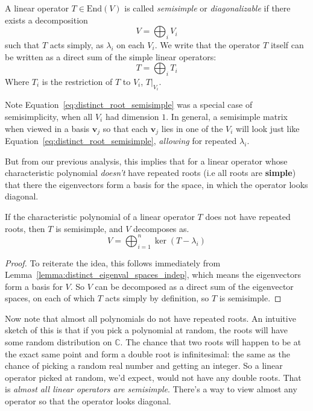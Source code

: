 \begin{appendices}
	\begin{defn}[Semisimplicity]
		A linear operator $T \in \mathrm{End}(V)$ is called \emph{semisimple} or \emph{diagonalizable} if there exists a decomposition 
		\begin{equation}
			V = \bigoplus_i V_i
		\end{equation}
		such that $T$ acts simply, as $\lambda_i$ on each $V_i$. We write that the operator $T$ itself can be written as a direct sum of the simple linear operators:
		\begin{equation}
			T = \bigoplus_i T_i
		\end{equation}
		Where $T_i$ is the restriction of $T$ to $V_i$, $T|_{V_i}$.
	\end{defn}
	
	
	Note Equation~\eqref{eq:distinct_root_semisimple} was a special case of semisimplicity, when all $V_i$ had dimension $1$. In general, a semisimple matrix when viewed in a basis $\mathbf v_j$ so that each $\mathbf v_j$ lies in one of the $V_i$ will look just like Equation~\eqref{eq:distinct_root_semisimple}, \emph{allowing} for repeated $\lambda_i$.
	
	But from our previous analysis, this implies that for a linear operator whose characteristic polynomial \emph{doesn't} have repeated roots (i.e  all roots are \textbf{simple}) that there the eigenvectors form a basis for the space, in which the operator looks diagonal. 
	\begin{theorem}\label{thm:semisimple_lacking_repeated_eigs}
		If the characteristic polynomial of a linear operator $T$ does not have repeated roots, then $T$ is semisimple, and $V$ decomposes as.
		\begin{equation}
			V = \bigoplus_{i=1}^n \ker(T - \lambda_i)
		\end{equation}
	\end{theorem}
	\begin{proof}
		To reiterate the idea, this follows immediately from Lemma~\ref{lemma:distinct_eigenval_spaces_indep}, which means the eigenvectors form a basis for $V$. So $V$ can be decomposed as a direct sum of the eigenvector spaces, on each of which $T$ acts simply by definition, so $T$ is semisimple. 
	\end{proof}
	
	Now note that almost all polynomials do not have repeated roots. An intuitive sketch of this is that if you pick a polynomial at random, the roots will have some random distribution on $\mathbb{C}$. The chance that two roots will happen to be at the exact same point and form a double root is infinitesimal: the same as the chance of picking a random real number and getting an integer. So a linear operator picked at random, we'd expect, would not have any double roots. That is \emph{almost all linear operators are semisimple}. There's a way to view almost any operator so that the operator looks diagonal.
	

\end{appendices}
